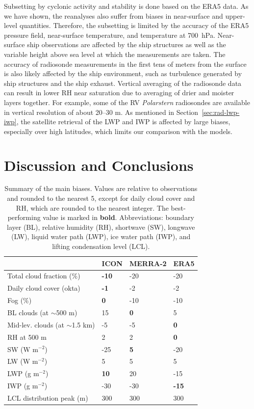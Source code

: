 \documentclass[draft]{agujournal2019}
\begin{document}
Subsetting by cyclonic activity and stability is done based on the ERA5 data. As we have shown, the reanalyses also suffer from biases in near-surface and upper-level quantities. Therefore, the subsetting is limited by the accuracy of the ERA5 pressure field, near-surface temperature, and temperature at 700~hPa. Near-surface ship observations are affected by the ship structures as well as the variable height above sea level at which the measurements are taken. The accuracy of radiosonde measurements in the first tens of meters from the surface is also likely affected by the ship environment, such as turbulence generated by ship structures and the ship exhaust. Vertical averaging of the radiosonde data can result in lower RH near saturation due to averaging of drier and moister layers together. For example, some of the RV \textit{Polarstern} radiosondes are available in vertical resolution of about 20–30 m. As mentioned in Section~\ref{sec:rad-lwp-iwp}, the satellite retrieval of the LWP and IWP is affected by large biases, especially over high latitudes, which limits our comparison with the models.

\section{Discussion and Conclusions}

\begin{table}[t]
\caption{Summary of the main biases. Values are relative to observations and rounded to the nearest 5, except for daily cloud cover and RH, which are rounded to the nearest integer. The best-performing value is marked in \textbf{bold}. Abbreviations: boundary layer (BL), relative humidity (RH), shortwave (SW), longwave (LW), liquid water path (LWP), ice water path (IWP), and lifting condensation level (LCL).}
\label{tab:summary}
\centering
\begin{tabular}{llll}
& ICON & MERRA-2 & ERA5\\
\hline
Total cloud fraction (\%) & \textbf{-10} & -20 & -20\\
Daily cloud cover (okta) & \textbf{-1} & -2 & -2\\
Fog (\%) & \textbf{0} & -10 & -10\\
BL clouds (at $\sim$500 m) & 15 & \textbf{0} & 5\\
Mid-lev. clouds (at $\sim$1.5 km) & -5 & -5 & \textbf{0}\\
RH at 500 m & 2 & 2 & \textbf{0}\\
SW (W m$^{-2}$) & -25 & \textbf{5} & -20\\
LW (W m$^{-2}$) & 5 & 5 & 5\\
LWP (g m$^{-2}$) & \textbf{10} & 20 & -15\\
IWP (g m$^{-2}$) & -30 & -30 & \textbf{-15}\\
LCL distribution peak (m) & 300 & 300 & 300\\
\hline
\end{tabular}
\end{table}
\end{document}
